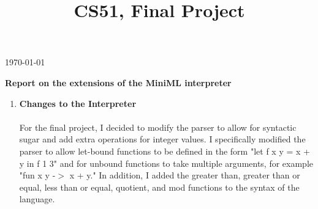 \documentclass[12pt]{amsart}
\title{CS51, Final Project} %
\theoremstyle{definition}
\theoremstyle{remark}
\begin{document}
\maketitle

\vspace*{-0.25in}
\centerline{\today}

\vspace*{0.15in}

\centerline{\textbf{Report on the extensions of the MiniML interpreter}}
\centerline{}

\begin{enumerate}
	\item \textbf{Changes to the Interpreter}\\
	\\
	For the final project, I decided to modify the parser to allow for syntactic sugar and add extra operations for integer values. I specifically modified the parser to allow let-bound functions to be defined in the form "let f x y = x + y in f 1 3" and for unbound functions to take multiple arguments, for example "fun x y -$>$ x + y." In addition, I added the greater than, greater than or equal, less than or equal, quotient, and mod functions to the syntax of the language.  \\
	

\end{enumerate}
\end{document}
